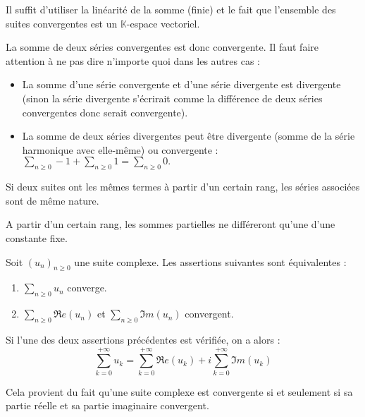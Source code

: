 \documentclass[french,11pt,twoside]{VcCours}
\newcommand{\Sum}[2]{\ensuremath{\textstyle{\sum\limits_{#1}^{#2}}}}
\begin{document}
\begin{preuve}
Il suffit d'utiliser la linéarité de la somme (finie) et le fait que l'ensemble des suites convergentes est un $\mathbb{K}$-espace vectoriel.
\end{preuve}

\begin{rem} La somme de deux séries convergentes est donc convergente. Il faut faire attention à ne pas dire n'importe quoi dans les autres cas :
\begin{itemize}
\item La somme d'une série convergente et d'une série divergente est divergente (sinon la série divergente s'écrirait comme la différence de deux séries convergentes donc serait convergente).
\item La somme de deux séries divergentes peut être divergente (somme de la série harmonique avec elle-même) ou convergente :  $\Sum{n \geq 0}{} - 1 +  \Sum{n \geq 0}{} 1 = \Sum{n \geq 0}{} 0.$
\end{itemize}
\end{rem}

\begin{prop} Si deux suites ont les mêmes termes à partir d'un certain rang, les séries associées sont de même nature.
\end{prop}

\begin{preuve}
A partir d'un certain rang, les sommes partielles ne différeront qu'une d'une constante fixe.
\end{preuve}

\begin{prop}\label{ConvSerCompl}
Soit $(u_n)_{n \geq 0}$ une suite complexe. Les assertions suivantes sont équivalentes :

\begin{enumerate}
\item $\Sum{n \geq 0}{} u_n$ converge.
\item $\Sum{n \geq 0}{} \Re e(u_n)$ et $\Sum{n \geq 0}{} \Im m(u_n)$ convergent.
\end{enumerate}
Si l'une des deux assertions précédentes est vérifiée, on a alors :
$$ \sum_{k=0}^{+ \infty} u_k = \sum_{k=0}^{+ \infty} \Re e(u_k) + i \sum_{k=0}^{+ \infty} \Im m(u_k)$$
\end{prop}

\begin{preuve} 
Cela provient du fait qu'une suite complexe est convergente si et seulement si sa partie réelle et sa partie imaginaire convergent.
\end{preuve}
\end{document}
